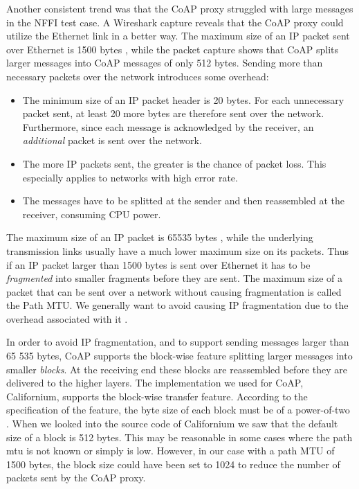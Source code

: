 Another consistent trend was that the CoAP proxy struggled with large messages
in the NFFI test case. A Wireshark capture reveals that the CoAP proxy could
utilize the Ethernet link in a better way. The maximum size of an IP packet sent
over Ethernet is 1500 bytes \cite{rfc-894}, while the packet capture shows that
CoAP splits larger messages into CoAP messages of only 512 bytes. Sending more
than necessary packets over the network introduces some overhead:

\begin{itemize}

    \item The minimum size of an IP packet header is 20 bytes. For each
    unnecessary packet sent, at least 20 more bytes are therefore sent over the
    network. Furthermore, since each message is acknowledged by the receiver, an
    \textit{additional} packet is sent over the network.

    \item The more IP packets sent, the greater is the chance of packet loss.
    This especially applies to networks with high error rate.

    \item The messages have to be splitted at the sender and then reassembled at
    the receiver, consuming CPU power.

\end{itemize}

The maximum size of an IP packet is 65535 bytes \cite{rfc-791}, while the underlying
transmission links usually have a much lower maximum size on its packets. Thus if
an IP packet larger than 1500 bytes is sent over Ethernet it has to be
\textit{fragmented} into smaller fragments before they are sent. The maximum
size of a packet that can be sent over a network without causing fragmentation
is called the Path MTU. We generally want to avoid causing IP fragmentation due
to the overhead associated with it \cite{genkov2006avoiding}.

In order to avoid IP fragmentation, and to support sending messages larger than
65 535 bytes, CoAP supports the block-wise feature splitting larger messages
into smaller \textit{blocks}. At the receiving end these blocks are reassembled
before they are delivered to the higher layers. The implementation we used for
CoAP, Californium, supports the block-wise transfer feature. According to the
specification of the feature, the byte size of each block must be of a
power-of-two \cite{draft-coap-blockwise}. When we looked into the source code of
Californium we saw that the default size of a block is 512 bytes. This may be
reasonable in some cases where the path \gls{mtu} is not known or simply is low.
However, in our case with a path MTU of 1500 bytes, the block size could have
been set to 1024 to reduce the number of packets sent by the CoAP proxy.

